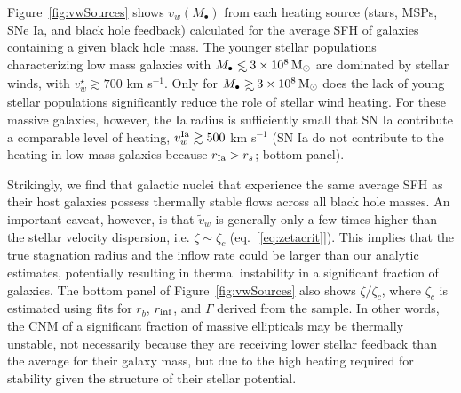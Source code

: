 \documentclass[usenatbib,fleqn]{mn2e}
\newcommand\lsim{\mathrel{\rlap{\lower4pt\hbox{\hskip1pt$\sim$}}
    \raise1pt\hbox{$<$}}}
\newcommand\gsim{\mathrel{\rlap{\lower4pt\hbox{\hskip1pt$\sim$}}
    \raise1pt\hbox{$>$}}}
\newcommand{\rs}{r_s}
\newcommand{\vw}{\tilde{v}_{w}}
\newcommand{\Mbh}[1][]{M_{\bullet#1}}
\newcommand{\rinf}{r_{\rm inf}}
\newcommand{\vwO}{v_{w}}
\begin{document}
Figure~\ref{fig:vwSources} shows $\vwO(M_{\bullet})$ from each heating
source (stars, MSPs, SNe Ia, and black hole feedback) calculated for
the average SFH of galaxies containing a given black hole mass.  The
younger stellar populations characterizing low mass galaxies with $\Mbh\lsim
3\times 10^{8} \Msun$ are dominated by stellar winds, with
$v_{w}^{\star} \gtrsim 700$ km s$^{-1}$.  Only for $\Mbh\gsim 3\times
10^{8} \Msun$ does the lack of young stellar populations significantly
reduce the role of stellar wind heating.  For these massive
galaxies, however, the Ia radius is sufficiently small that SN Ia contribute
a comparable level of heating, $v_{w}^{\rm Ia} \gtrsim 500$ km
s$^{-1}$ (SN Ia do not contribute to the heating in low mass galaxies because $r_{\rm Ia} > \rs$; bottom panel).  

Strikingly, we find that galactic nuclei that experience the same
average SFH as their host galaxies possess thermally stable flows
across all black hole masses.  An important caveat, however, is that
$\vw$ is generally only a few times higher than the stellar velocity
dispersion, i.e. $\zeta \sim \zeta_c$ (eq.~[\ref{eq:zetacrit}]).  This
implies that the true stagnation radius and the inflow rate could be
larger than our analytic estimates, potentially resulting in thermal
instability in a significant fraction of galaxies.  The bottom panel
of Figure~\ref{fig:vwSources} also shows $\zeta/\zeta_c$, where
$\zeta_c$ is estimated using fits for $r_b$, $\rinf$, and $\Gamma$
derived from the \citet{LauerFaber+:2007a} sample.  In other words,
the CNM of a significant fraction of massive ellipticals may be
thermally unstable, not necessarily because they are receiving lower
stellar feedback than the average for their galaxy mass, but due to
the high heating required for stability given the structure of their
stellar potential.
\end{document}
